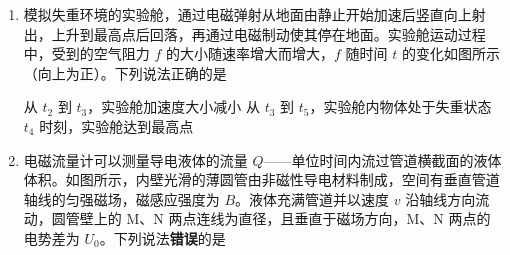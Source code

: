 \documentclass[\gkver]{gaokaozhenti}
\begin{document}
\begin{enumerate}
{C．磁铁离线圈最近时，此时磁铁与线圈的相对速度为零，感应电动势为零，感应电流为零，线圈受到的安培力为零，故 C 错误；

D．分析可知有无线圈时，根据平衡条件最后磁铁静止后弹簧的伸长量相同，由于磁铁和弹簧组成的系统损失的机械能为磁铁减小的重力势能减去此时弹簧的弹性势能，故系统损失的机械能相同，故 D 正确。

故选 D。
}

\item
模拟失重环境的实验舱，通过电磁弹射从地面由静止开始加速后竖直向上射出，上升到最高点后回落，再通过电磁制动使其停在地面。实验舱运动过程中，受到的空气阻力 $f$ 的大小随速率增大而增大，$f$ 随时间 $t$ 的变化如图所示（向上为正）。下列说法正确的是

\onepicture[w=5.41cm]{}

{从 $t_{2}$ 到 $t_{3}$，实验舱加速度大小减小}
{从 $t_{3}$ 到 $t_{5}$，实验舱内物体处于失重状态}
{$t_{4}$ 时刻，实验舱达到最高点}


\item
电磁流量计可以测量导电液体的流量 $Q$——单位时间内流过管道横截面的液体体积。如图所示，内壁光滑的薄圆管由非磁性导电材料制成，空间有垂直管道轴线的匀强磁场，磁感应强度为 $B$。液体充满管道并以速度 $v$ 沿轴线方向流动，圆管壁上的 M、N 两点连线为直径，且垂直于磁场方向，M、N 两点的电势差为 $U_{0}$。下列说法\textbf{错误}的是


\end{enumerate}
\end{document}

